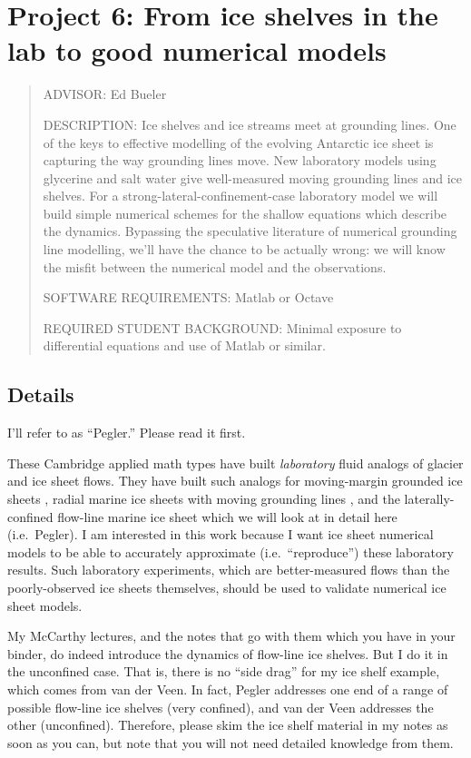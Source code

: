 \documentclass[11pt,final]{amsart}%
\newcommand{\citep}[1]{\cite{#1}}
\begin{document}
\newpage
\section*{Project 6: From ice shelves in the lab to good numerical models}

\begin{quote}
\noindent ADVISOR: Ed Bueler

\medskip
\noindent DESCRIPTION:  Ice shelves and ice streams meet at grounding lines.  One of the keys to effective modelling of the evolving Antarctic ice sheet is capturing the way grounding lines move.  New laboratory models using glycerine and salt water give well-measured moving grounding lines and ice shelves.  For a strong-lateral-confinement-case laboratory model \citep{Pegleretal2013} we will build simple numerical schemes for the shallow equations which describe the dynamics.  Bypassing the speculative literature of numerical grounding line modelling, we'll have the chance to be actually wrong: we will know the misfit between the numerical model and the observations.

\medskip
\noindent SOFTWARE REQUIREMENTS: Matlab or Octave

\medskip
\noindent REQUIRED STUDENT BACKGROUND: Minimal exposure to differential equations and use of Matlab or similar.
\end{quote}

\subsection*{Details}  I'll refer to  \cite{Pegleretal2013} as ``Pegler.''  Please read it first.

These Cambridge applied math types have built \emph{laboratory} fluid analogs of glacier and ice sheet flows.  They have built such analogs for moving-margin grounded ice sheets \citep{SayagWorster2013}, radial marine ice sheets with moving grounding lines \citep{PeglerWorster2012,SayagPeglerWorster2012}, and the laterally-confined flow-line marine ice sheet which we will look at in detail here (i.e.~Pegler).  I am interested in this work because I want ice sheet numerical models to be able to accurately approximate (i.e.~``reproduce'') these laboratory results.  Such laboratory experiments, which are better-measured flows than the poorly-observed ice sheets themselves, should be used to validate numerical ice sheet models.

My McCarthy lectures, and the notes that go with them which you have in your binder, do indeed introduce the dynamics of flow-line ice shelves.  But I do it in the unconfined case.  That is, there is no ``side drag'' for my ice shelf example, which comes from van der Veen.  In fact, Pegler addresses one end of a range of possible flow-line ice shelves (very confined), and van der Veen addresses the other (unconfined).  Therefore, please skim the ice shelf material in my notes as soon as you can, but note that you will not need detailed knowledge from them.
\end{document}

